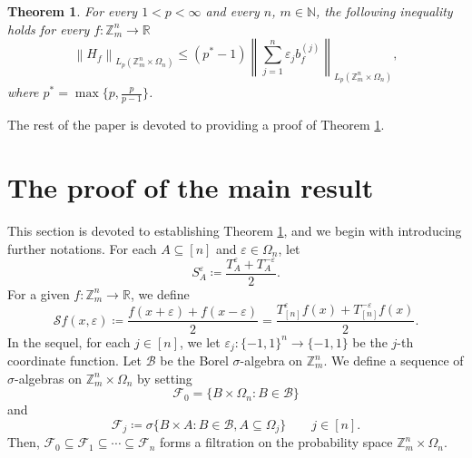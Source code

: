 \documentclass{amsart}
\numberwithin{equation}{section}
\newtheorem{thm}{Theorem}[section]
\newcommand{\N}{{\mathbb N}}
\newcommand{\Z}{{\mathbb{Z}^{n}_{m}}}
\begin{document}
\begin{thm}\label{NS-main}
For every $1<p<\infty$ and every $n$, $m\in \N$, the following inequality holds for every $f:\Z\to \mathbb{R}$
\begin{equation}
\left\|H_{f}\right\|_{L_{p}(\Z\times \Omega_{n})}\leq (p^{*}-1)\left\|\sum_{j=1}^{n}\varepsilon_{j}b^{(j)}_{f}\right\|_{L_{p}(\Z\times \Omega_{n})},
\end{equation}
where $p^{*}=\max\{p,\frac{p}{p-1}\}$.
\end{thm}
\noindent The rest of the paper is devoted to providing a proof of Theorem \ref{NS-main}.

\section{The proof of the main result}
This section is devoted to establishing Theorem \ref{NS-main}, and we begin with introducing further notations. For each $A\subseteq [n]$ and $\varepsilon\in \Omega_{n}$,  let  
\[
S^{\varepsilon}_{A}\coloneqq \frac{T^{\varepsilon}_{A}+T^{-\varepsilon}_{A}}{2}.
\]
For a given $f:\Z\to \mathbb{R}$, we define
\[
\mathcal{S}f(x,\varepsilon)\coloneqq \frac{f(x+\varepsilon)+f(x-\varepsilon)}{2}=\frac{T^{\varepsilon}_{[n]}f(x)+T^{-\varepsilon}_{[n]}f(x)}{2}.
\]
In the sequel, for each $j\in[n]$, we let $\varepsilon_{j}:\{-1,1\}^{n}\to \{-1,1\}$ be the $j$-th coordinate function. Let $\mathcal{B}$ be the Borel $\sigma$-algebra on $\Z$. We define a sequence of $\sigma$-algebras on $\Z\times \Omega_{n}$ by setting
\[
\mathcal{F}_0=\{B\times \Omega_{n}: B\in\mathcal{B}\}
\]
and
\[
\mathcal{F}_{j}\coloneqq \sigma\{B\times A: B\in \mathcal{B}, A\subseteq \Omega_{j}\}\qquad  j\in [n].
\]
Then, $\mathcal{F}_{0}\subseteq \mathcal{F}_{1}\subseteq \cdots\subseteq \mathcal{F}_{n}$ forms a filtration on the probability space $\Z\times \Omega_{n}$.
\end{document}
